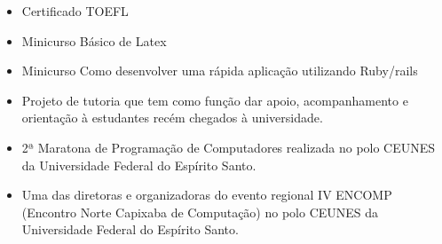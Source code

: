 












\smallskip
\begin{itemize}
\item Certificado TOEFL
\smallskip
\item Minicurso Básico de Latex
\smallskip
\item Minicurso Como desenvolver uma rápida aplicação utilizando
Ruby/rails
\smallskip
\end{itemize}
\bigskip

\begin{itemize}
\item Projeto de tutoria que tem como função dar apoio, acompanhamento e orientação à estudantes recém chegados à universidade.
\end{itemize}
\smallskip
{}
\begin{itemize}
\item 2ª Maratona de Programação de Computadores realizada no polo CEUNES da Universidade Federal do Espírito Santo.
\end{itemize}
\smallskip
{}
\begin{itemize}
\item Uma das diretoras e organizadoras do evento regional IV ENCOMP (Encontro Norte Capixaba de Computação) no polo CEUNES da Universidade Federal do Espírito Santo.
\end{itemize}
\smallskip
\cvproject{}